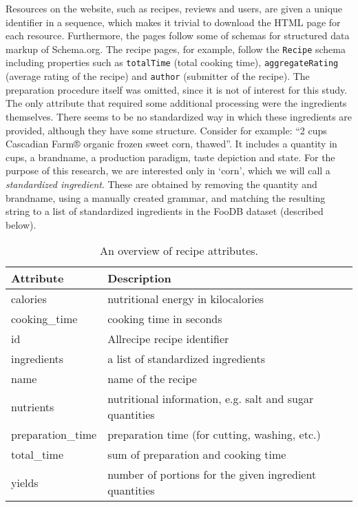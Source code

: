 Resources on the website, such as recipes, reviews and users, are given a unique identifier in a sequence, which makes it trivial to download the HTML page for each resource.
Furthermore, the pages follow some of schemas for structured data markup of Schema.org.
The recipe pages, for example, follow the \texttt{Recipe} schema including properties such as \texttt{totalTime} (total cooking time), \texttt{aggregateRating} (average rating of the recipe) and \texttt{author} (submitter of the recipe).
The preparation procedure itself was omitted, since it is not of interest for this study.
The only attribute that required some additional processing were the ingredients themselves.
There seems to be no standardized way in which these ingredients are provided, although they have some structure.
Consider for example: ``2 cups Cascadian Farm® organic frozen sweet corn, thawed''.
It includes a quantity in cups, a brandname, a production paradigm, taste depiction and state.
For the purpose of this research, we are interested only in `corn', which we will call a \emph{standardized ingredient}.
These are obtained by removing the quantity and brandname, using a manually created grammar, and matching the resulting string to a list of standardized ingredients in the FooDB dataset (described below).

\begin{table}[htbp]
	\caption{An overview of recipe attributes.}
	\label{tab:recipe_attributes}
	
	\centering
	\begin{tabular}{l l}
		\toprule
		\textbf{Attribute} & \textbf{Description} \\
		\midrule
		calories & nutritional energy in kilocalories \\
 		cooking\_time & cooking time in seconds \\
 		id & Allrecipe recipe identifier \\
 		ingredients & a list of standardized ingredients \\
 		name & name of the recipe \\
 		nutrients & nutritional information, e.g. salt and sugar quantities \\
 		preparation\_time & preparation time (for cutting, washing, etc.) \\
 		total\_time & sum of preparation and cooking time \\
 		yields & number of portions for the given ingredient quantities \\
 	\bottomrule
	\end{tabular}
\end{table}

